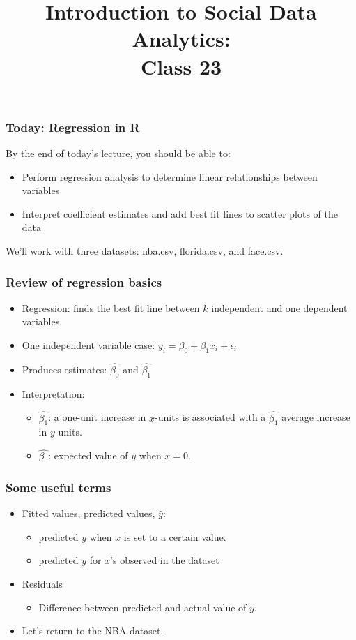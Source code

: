 \documentclass[handout,compress]{beamer}
\title[Class 23]{Introduction to Social Data Analytics: \\
Class 23}
\author[]{}
\institute[UCSD]{}
\date[]{}
\begin{document}
\frame{\titlepage}

\begin{frame}
\frametitle{Today: Regression in R}
By the end of today's lecture, you should be able to:
\begin{itemize}
	\item Perform regression analysis to determine linear relationships between variables
	\item Interpret coefficient estimates and add best fit lines to scatter plots of the data
\end{itemize} \bigskip
We'll work with three datasets: nba.csv, florida.csv, and face.csv.
\end{frame}

\begin{frame}[fragile]
 \frametitle{Review of regression basics}
 \pause
\begin{itemize} \itemsep1em
\item Regression: finds the \alert{best fit} line between $k$ independent and one dependent variables.
\item One independent variable case: $y_i = \beta_0 + \beta_1x_i + \epsilon_i$ \pause
\item Produces \alert{estimates}: $\hat{\beta_0}$ and $\hat{\beta_1}$ 
\item \alert{Interpretation:} \pause
	\begin{itemize}
		\item $\hat{\beta_1}$: a one-unit increase in $x$-units is associated with a $\hat{\beta_1}$ average increase in $y$-units. \pause
		\item $\hat{\beta_0}$: \alert{expected} value of $y$ when $x=0$. 
	\end{itemize}
\end{itemize}
\end{frame}

\begin{frame}[fragile]
 \frametitle{Some useful terms}
\begin{itemize} \itemsep1em
\item \alert{Fitted values}, \alert{predicted values}, \alert{$\hat{y}$}:
\begin{itemize}
\item predicted $y$ when $x$ is set to a certain value.
\item predicted $y$ for $x$'s observed in the dataset
\end{itemize}
\item \alert{Residuals}
\begin{itemize}
\item Difference between \alert{predicted} and \alert{actual} value of $y$.
\end{itemize}
\item Let's return to the NBA dataset.
\end{itemize}
\end{frame}
\end{document}
